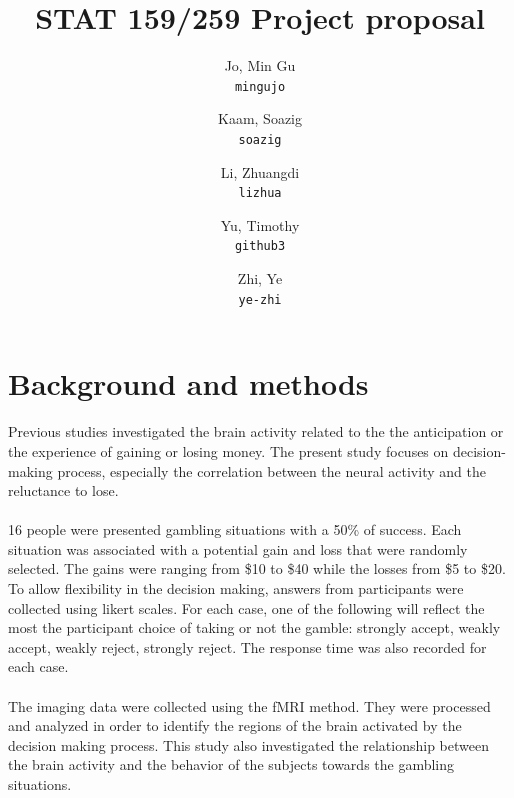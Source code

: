 \documentclass{article}
\begin{document}
\title{STAT 159/259 Project proposal }
\author{
  Jo, Min Gu\\
  \texttt{mingujo}
  \and
  Kaam, Soazig\\
  \texttt{soazig}
  \and
  Li, Zhuangdi\\
  \texttt{lizhua}
  \and
  Yu, Timothy\\
  \texttt{github3}
  \and
  Zhi, Ye\\
  \texttt{ye-zhi}
  }

\maketitle


\section{Background and methods}
\noindent
Previous studies investigated the brain activity related to the the anticipation or the experience of gaining or losing money. The present study focuses on decision-making process, especially the correlation between the neural activity and the reluctance to lose.\\\\
16 people were presented gambling situations with a 50\% of success. Each situation was associated with a potential gain and loss that were randomly selected. The gains were ranging from \$10 to \$40 while the losses from \$5 to \$20. To allow flexibility in the decision making, answers from participants were collected using likert scales. For each case, one of the following will reflect the most the participant choice of taking or not the gamble: strongly accept, weakly accept, weakly reject, strongly reject. The response time was also recorded for each case. \\\\
The imaging data were collected using the fMRI method. They were processed and analyzed in order to identify the regions of the brain activated by the decision making process. This study also investigated the relationship between the brain activity and the behavior of the subjects towards the gambling situations. 
\end{document}
